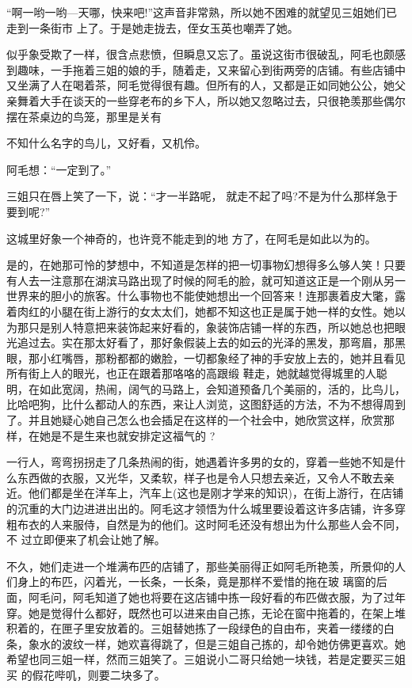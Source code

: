 \documentclass{article}
\begin{document}
“啊一哟一哟—天哪，快来吧!”这声音非常熟，所以她不困难的就望见三姐她们已走到一条街市
上了。于是她走拢去，侄女玉英也嘲弄了她。 

似乎象受欺了一样，很含点悲愤，但瞬息又忘了。虽说这街市很破乱，阿毛也颇感到趣味，一手拖着三姐的娘的手，随着走，又来留心到街两旁的店铺。有些店铺中又坐满了人在喝着茶，阿毛觉得很有趣。但所有的人，又都是正如同她公公，她父亲舞着大手在谈天的一些穿老布的乡下人，所以她又忽略过去，只很艳羡那些偶尔摆在茶桌边的鸟笼，那里是关有

\newpage
不知什么名字的鸟儿，又好看，又机伶。 


阿毛想：“一定到了。” 

三姐只在唇上笑了一下，说：“才一半路呢，
就走不起了吗?不是为什么那样急于要到呢?” 

这城里好象一个神奇的，也许竞不能走到的地
方了，在阿毛是如此以为的。 

是的，在她那可怜的梦想中，不知道是怎样的把一切事物幻想得多么够人笑！只要有人去一注意那在湖滨马路出现了时候的阿毛的脸，就可知道这正是一个刚从另一世界来的胆小的旅客。什么事物也不能使她想出一个回答来！连那裹着皮大氅，露着肉红的小腿在街上游行的女太太们，她都不知这也正是属于她一样的女性。她以为那只是别人特意把来装饰起来好看的，象装饰店铺一样的东西，所以她总也把眼光追过去。实在那太好看了，那好象假装上去的如云的光泽的黑发，那弯眉，那黑眼，那小红嘴唇，那粉都都的嫩脸，一切都象经了神的手安放上去的，她并且看见所有街上人的眼光，也正在跟着那咯咯的高跟缎
\newpage
鞋走，她就越觉得城里的人聪明，在如此宽阔，热闹，阔气的马路上，会知道预备几个美丽的，活的，比鸟儿，比哈吧狗，比什么都动人的东西，来让人浏览，这图舒适的方法，不为不想得周到了。并且她疑心她自己怎么也会插足在这样的一个社会中，她欣赏这样，欣赏那样，在她是不是生来也就安排定这福气的
? 

一行人，弯弯拐拐走了几条热闹的街，她遇着许多男的女的，穿着一些她不知是什么东西做的衣服，又光华，又柔软，样子也是令人只想去亲近，又令人不敢去亲近。他们都是坐在洋车上，汽车上(这也是刚才学来的知识)，在街上游行，在店铺的沉重的大门边进进出出的。阿毛这才领悟为什么城里要设着这许多店铺，许多穿粗布衣的人来服侍，自然是为的他们。这时阿毛还没有想出为什么那些人会不同，不
过立即便来了机会让她了解。 

不久，她们走进一个堆满布匹的店铺了，那些美丽得正如阿毛所艳羡，所景仰的人们身上的布匹，闪着光，一长条，一长条，竟是那样不爱惜的拖在玻
\newpage
璃窗的后面，阿毛问，阿毛知道了她也将要在这店铺中拣一段好看的布匹做衣服，为了过年穿。她是觉得什么都好，既然也可以进来由自己拣，无论在窗中拖着的，在架上堆积着的，在匣子里安放着的。三姐替她拣了一段绿色的自由布，夹着一缕缕的白条，象水的波纹一样，她欢喜得跳了，但是三姐自己拣的，却令她仿佛更喜欢。她希望也同三姐一样，然而三姐笑了。三姐说小二哥只给她一块钱，若是定要买三姐买
的假花哔叽，则要二块多了。 
\end{document}
